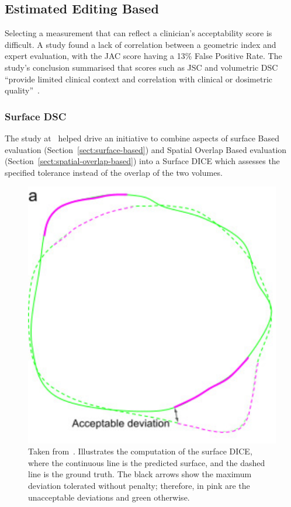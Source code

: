 \documentclass[11pt,twoside]{report}
\begin{document}
\subsection{Estimated Editing Based}\label{sect:surface-dice}

Selecting a measurement that can reflect a clinician's acceptability score is difficult. A study found a lack of correlation between a geometric index and expert evaluation, with the JAC score having a 13\% False Positive Rate. The study's conclusion summarised that scores such as JSC and volumetric DSC ``provide limited clinical context and correlation with clinical or dosimetric quality''~\cite{Sherer2021-le}.


\subsubsection{Surface DSC}\label{sect:surface-DSC}

The study at~\cite{Sherer2021-le} helped drive an initiative to combine aspects of surface Based evaluation (Section~\ref{sect:surface-based}) and Spatial Overlap Based evaluation (Section~\ref{sect:spatial-overlap-based}) into a Surface DICE which assesses the specified tolerance instead of the overlap of the two volumes.

\begin{figure}[H]
  \centering
  \includegraphics[width=0.3\linewidth]{../figures/Surface-dice.png}
  \caption{Taken from~\cite{Nikolov2021-xe}. Illustrates the computation of the surface DICE, where the continuous line is the predicted surface, and the dashed line is the ground truth. The black arrows show the maximum deviation tolerated without penalty; therefore, in pink are the unacceptable deviations and green otherwise.}\label{fig:surface-dice}
\end{figure}
\end{document}
